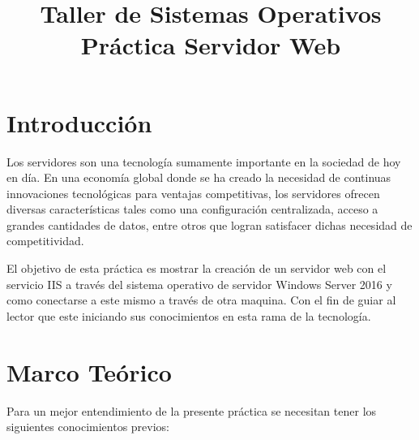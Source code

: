 \documentclass[letterpaper,12pt]{article} %
\begin{document}
    
    \tableofcontents
    \newpage
    \listoffigures

\title{Taller de Sistemas Operativos \\\textbf{Práctica Servidor Web} \\ }
\date{}

\maketitle
\thispagestyle{fancy}


\section{Introducción}
Los servidores son una tecnología sumamente importante en la sociedad de hoy en día. En una economía global donde se ha creado la necesidad de continuas innovaciones tecnológicas para ventajas competitivas, los servidores ofrecen diversas características tales como una configuración centralizada, acceso a grandes cantidades de datos, entre otros que logran satisfacer dichas necesidad de competitividad.\cite{zapico2007new}\cite{servers}\par

El objetivo de esta práctica es mostrar la creación de un servidor web con el servicio IIS a través del sistema operativo de servidor Windows Server 2016 y como conectarse a este mismo a través de otra maquina. Con el fin de guiar al lector que este iniciando sus conocimientos en esta rama de la tecnología.


\newpage
\vspace{1cm}

\section{Marco Teórico}

Para un mejor entendimiento de la presente práctica se necesitan tener los siguientes conocimientos previos:
\end{document}
